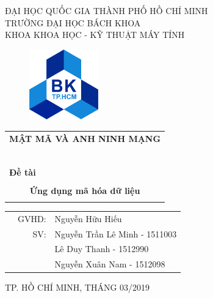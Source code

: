\documentclass[a4paper]{article}
\begin{document}
\begin{titlepage}
\begin{center}
ĐẠI HỌC QUỐC GIA THÀNH PHỐ HỒ CHÍ MINH \\
TRƯỜNG ĐẠI HỌC BÁCH KHOA \\
KHOA KHOA HỌC - KỸ THUẬT MÁY TÍNH 
\end{center}

\vspace{1cm}

\begin{figure}[htp]
\begin{center}
\includegraphics[width=3cm]{hcmut.png}
\end{center}
\end{figure}

\vspace{1cm}


\begin{center}
\begin{tabular}{c}
\multicolumn{1}{l}{\textbf{{\Large MẬT MÃ VÀ ANH NINH MẠNG}}}\\
~~\\
\hline
\\
\multicolumn{1}{l}{\textbf{{\Large Đề tài}}}\\
\\
\textbf{{\Huge Ứng dụng mã hóa dữ liệu}}\\
\\
\hline
\end{tabular}
\end{center}

\vspace{3cm}

\begin{table}[h]
\begin{tabular}{rrl}
\hspace{5 cm} & GVHD: & Nguyễn Hữu Hiếu\\
& SV: & Nguyễn Trần Lê Minh - 1511003 \\
& & Lê Duy Thanh - 1512990 \\
& & Nguyễn Xuân Nam - 1512098\\
\end{tabular}
\end{table}

\begin{center}
{\footnotesize TP. HỒ CHÍ MINH, THÁNG 03/2019}
\end{center}
\end{titlepage}
\end{document}
